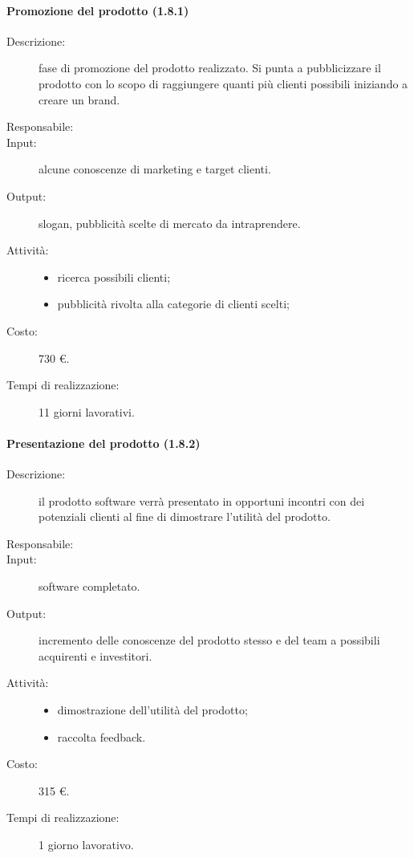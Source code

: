 \paragraph{Promozione del prodotto (1.8.1)}
\begin{description}
\item[Descrizione:] fase di promozione del prodotto realizzato. Si punta a pubblicizzare il prodotto con lo scopo di raggiungere quanti più clienti possibili iniziando a creare un brand.
\item[Responsabile:] 
\item[Input:] alcune conoscenze di marketing e target clienti.
\item[Output:] slogan, pubblicità scelte di mercato da intraprendere.
\item[Attività:] 
\begin{center}
\begin{itemize}
\item ricerca possibili clienti;
\item pubblicità rivolta alla categorie di clienti scelti;
\end{itemize}
\end{center}
\item[Costo:] 730 \euro{}.
\item[Tempi di realizzazione:] 11 giorni lavorativi.
\end{description}

\paragraph{Presentazione del prodotto (1.8.2)}
\begin{description}
\item[Descrizione:] il prodotto software verrà presentato in opportuni incontri con dei potenziali clienti al fine di dimostrare l'utilità del prodotto.
\item[Responsabile:] 
\item[Input:] software completato.
\item[Output:] incremento delle conoscenze del prodotto stesso e del team a possibili acquirenti e investitori. 
\item[Attività:] 
\begin{center}
\begin{itemize}
\item dimostrazione dell'utilità del prodotto;
\item raccolta feedback.
\end{itemize}
\end{center}
\item[Costo:] 315 \euro{}.
\item[Tempi di realizzazione:] 1 giorno lavorativo.
\end{description}
